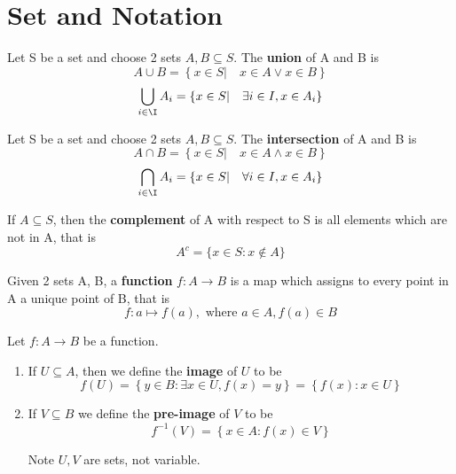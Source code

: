 \documentclass[11pt]{article}
\begin{document}
\section{Set and Notation}


\begin{defn}
  \label{union}
  Let S be a set and choose 2 sets $A, B \subseteq S$. The \textbf{union} of A and B is
  \[
    A\cup B = \left\{ x\in S | \quad x\in A \lor x\in B \right\}
  \]
  \[
    \bigcup_{i\in \I} A_i = \left\{ x\in S | \quad \exists i\in I, x\in A_i\right\}
  \]
\end{defn}

\begin{defn}
  \label{intersection}
  Let S be a set and choose 2 sets $A, B \subseteq S$. The \textbf{intersection} of A and B is
  \[
    A\cap B = \left\{ x\in S| \quad x\in A \land x\in B \right\}
  \]
  \[
    \bigcap_{i\in\I} A_i = \left\{ x\in S | \quad \forall i \in I, x\in A_i \right\}
  \]
\end{defn}

\begin{defn}
  \label{setcomplement}
  If $A\subseteq S$, then the \textbf{complement} of A with respect to S is all elements which are not in A, that is
  \[
    A^c = \{ x\in S: x\not\in A \}
  \]
\end{defn}

\begin{defn}
  \label{function}
  Given 2 sets A, B, a \textbf{function} $f: A\to B$ is a map which assigns to every point in A a unique point of B, that is
  \[
    f: a \mapsto f(a), \text{ where } a\in A, f(a)\in B
  \]
\end{defn}

\begin{defn}
  \label{image and preimage}
  Let $f: A\to B$ be a function.
  \begin{enumerate}
    \item If $U \subseteq A$, then we define the \textbf{image} of $U$ to be
    \[
      f(U) = \left\{ y\in B: \exists x\in U, f(x) = y\right\} = \left\{ f(x): x\in U\right\}
    \]

    \item If $V\subseteq B$ we define the \textbf{pre-image} of $V$ to be
    \[
      f^{-1}(V) = \left\{ x\in A: f(x) \in V\right\}
    \]
    \begin{rem}
      Note $U,V$ are sets, not variable.
    \end{rem}
  \end{enumerate}
\end{defn}
\end{document}

